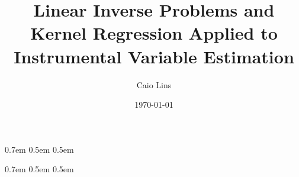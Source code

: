 \usepackage{local-macros}
\usepackage{biblatex}
\usepackage{csquotes}
\usepackage{enumitem}
\usepackage{microtype} %
\usepackage{hyperref}


        {0.7em}                    %
        {0.5em}                    %
        {\itshape}                   %
        {}                           %
        {\bfseries}                   %
        {}                          %
        {0.5em}                       %
        {}  %
\theoremstyle{default} %
\newtheorem{thm}{Theorem}
\newtheorem*{thm*}{Theorem}
\newtheorem{lemm}{Lemma}
\newtheorem*{lemm*}{Lemma}
\newtheorem{prop}{Proposition}
\newtheorem*{prop*}{Proposition}
\newtheorem{cor}{Corollary}
\newtheorem{corr}{Corollary}
\newtheorem*{axiom}{Axiom}
        {0.7em}                    %
        {0.5em}                    %
        {\normalfont}                   %
        {}                           %
        {\bfseries}                   %
        {}                          %
        {0.5em}                       %
        {}  %
\theoremstyle{plain}
\newtheorem{rem}{Remark}



\title{Linear Inverse Problems and Kernel Regression Applied to Instrumental Variable Estimation}
\author{Caio Lins}
\date{\today}
